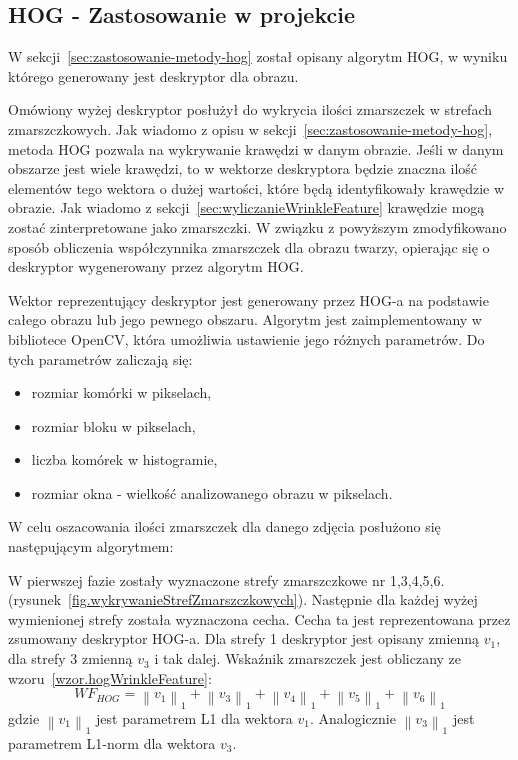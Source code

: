 \documentclass[a4paper,twoside,12pt]{book}
\begin{document}
    \subsection*{HOG - Zastosowanie w projekcie}\label{subsec:zastosowanie-w-projekcie2}
    W sekcji~\ref{sec:zastosowanie-metody-hog} został opisany algorytm HOG, w wyniku którego
    generowany jest deskryptor dla obrazu.

    Omówiony wyżej deskryptor posłużył do wykrycia ilości zmarszczek w strefach zmarszczkowych. Jak wiadomo z opisu w
    sekcji~\ref{sec:zastosowanie-metody-hog}, metoda HOG pozwala na wykrywanie krawędzi w danym obrazie. Jeśli w danym
    obszarze jest wiele krawędzi, to w wektorze deskryptora będzie znaczna ilość elementów tego wektora o dużej
    wartości, które będą identyfikowały krawędzie w obrazie. Jak wiadomo z
    sekcji~\ref{sec:wyliczanieWrinkleFeature} krawędzie mogą zostać zinterpretowane jako zmarszczki.
    W związku z powyższym zmodyfikowano sposób obliczenia współczynnika zmarszczek dla obrazu twarzy, opierając się o
    deskryptor wygenerowany przez algorytm HOG.

    Wektor reprezentujący deskryptor jest generowany przez HOG-a na podstawie całego obrazu lub jego pewnego obszaru.
    Algorytm jest zaimplementowany w bibliotece OpenCV,
    która umożliwia ustawienie jego różnych parametrów. Do tych parametrów zaliczają się:
    \begin{itemize}
        \item rozmiar komórki w pikselach,
        \item rozmiar bloku w pikselach,
        \item liczba komórek w histogramie,
        \item rozmiar okna - wielkość analizowanego obrazu w pikselach.
    \end{itemize}

    W celu oszacowania ilości zmarszczek dla danego zdjęcia posłużono się następującym algorytmem:

    W pierwszej fazie zostały wyznaczone strefy zmarszczkowe nr 1,3,4,5,6.
    (rysunek~\ref{fig.wykrywanieStrefZmarszczkowych}).
    Następnie dla każdej wyżej wymienionej strefy została wyznaczona cecha. Cecha ta jest reprezentowana przez
    zsumowany deskryptor HOG-a. Dla strefy 1 deskryptor jest opisany
    zmienną $v_{1}$, dla strefy 3 zmienną $v_{3}$ i tak dalej.
    Wskaźnik zmarszczek jest obliczany ze wzoru~\ref{wzor.hogWrinkleFeature}:
    \large
    \begin{equation}
        WF_{HOG} = \left \|v_{1}  \right \|_{1}+\left \|v_{3}  \right \|_{1}+\left \|v_{4}  \right \|_{1}+\left
        \|v_{5}  \right \|_{1}+\left \|v_{6}  \right \|_{1}
        \label{wzor.hogWrinkleFeature}
    \end{equation}
    \normalsize
    gdzie $\left \|v_{1}  \right \|_{1}$ jest parametrem L1 dla wektora $v_{1}$. Analogicznie $\left \|v_{3}
    \right \|_{1}$  jest parametrem L1-norm dla wektora $v_{3}$.
\end{document}
